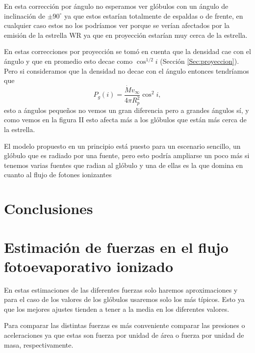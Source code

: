 \documentclass{book}
\begin{document}
En esta corrección por ángulo no esperamos ver glóbulos con un ángulo de inclinación de $\pm 90^\circ$ ya que estos estarían totalmente de espaldas o de frente, en cualquier caso estos no los podríamos ver porque se verían afectados por la emisión de la estrella WR ya que en proyección estarían muy cerca de la estrella.

En estas correcciones por proyección se tomó en cuenta que la densidad cae con el ángulo y que en promedio esto decae como $\cos^{1/2}{i}$ (Sección \ref{Sec:proyeccion}). Pero si consideramos que la densidad no decae con el ángulo entonces tendríamos que 
\[P_g(i)= \frac{\dot{M}v_\infty}{4\pi R_p^2}\cos^2 i,\] esto a ángulos pequeños no vemos un gran diferencia pero a grandes ángulos sí, y como vemos en la figura II esto afecta más a los glóbulos que están más cerca de la estrella. 

El modelo propuesto en un principio está puesto para un escenario sencillo, un glóbulo que es radiado por una fuente, pero esto podría ampliarse un poco más si tenemos varias fuentes que radian al glóbulo y una de ellas es la que domina en cuanto al flujo de fotones ionizantes


\chapter{Conclusiones}



\appendix
\chapter{Estimación de fuerzas en el flujo fotoevaporativo ionizado} \label{App:fuerzas}

En estas estimaciones de las diferentes fuerzas solo haremos aproximaciones y para el caso de los valores de los glóbulos usaremos solo los más típicos. Esto ya que los mejores ajustes  tienden a tener a la media en los diferentes valores.

Para comparar las distintas fuerzas es más conveniente comparar las presiones o aceleraciones ya que estas son fuerza por unidad de área o fuerza por unidad de masa, respectivamente. 
\end{document}
